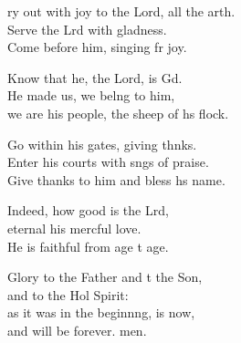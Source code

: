 \settowidth{\versewidth}{Cry out with joy to the Lord, all the earth. +}
\begin{psalmverse}%
  \begin{patverse}
    ry out with joy to the Lord, all the arth.\Flex\\
Serve the Lrd with gladness.\Med\\
Come before him, singing fr joy.

Know that he, the Lord, is Gd.\Flex\\
He made us, we belng to him,\Med\\
we are his people, the sheep of h\pointup{\i}s flock.

Go within his gates, giving thnks.\Flex\\
Enter his courts with sngs of praise.\Med\\
Give thanks to him and bless h\pointup{\i}s name.

Indeed, how good is the Lrd,\Flex\\
eternal his merc\pointup{\i}ful love.\Med\\
He is faithful from age t age.

Glory to the Father and t the Son,\Med\\
and to the Hol Spirit:\\
as it was in the beginn\pointup{\i}ng, is now,\Med\\
and will be forever. men.
  \end{patverse}
\end{psalmverse}
